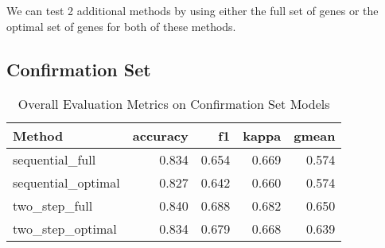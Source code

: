 \documentclass[
]{report}
\begin{document}
We can test 2 additional methods by using either the full set of genes or the optimal set of genes for both of these methods.

\hypertarget{confirmation-set}{%
\subsection{Confirmation Set}\label{confirmation-set}}

\begin{table}

\caption{\label{tab:conf-eval-overall}Overall Evaluation Metrics on Confirmation Set Models}
\centering
\begin{tabular}[t]{l|r|r|r|r}
\hline
Method & accuracy & f1 & kappa & gmean\\
\hline
sequential\_full & 0.834 & 0.654 & 0.669 & 0.574\\
\hline
sequential\_optimal & 0.827 & 0.642 & 0.660 & 0.574\\
\hline
two\_step\_full & 0.840 & 0.688 & 0.682 & 0.650\\
\hline
two\_step\_optimal & 0.834 & 0.679 & 0.668 & 0.639\\
\hline
\end{tabular}
\end{table}
\end{document}
